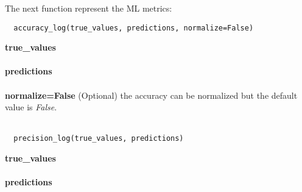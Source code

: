 The next function represent the ML metrics: \\

\begin{lstlisting}
  accuracy_log(true_values, predictions, normalize=False)
\end{lstlisting}

\noindent\textbf{true\_values}
\\ \\
\textbf{predictions}
\\ \\
\textbf{normalize=False}
(Optional) the accuracy can be normalized but the default value is \textit{False}. \\ \\

\begin{lstlisting}
  precision_log(true_values, predictions)
\end{lstlisting}

\noindent\textbf{true\_values}
\\ \\
\textbf{predictions}
\\ \\

